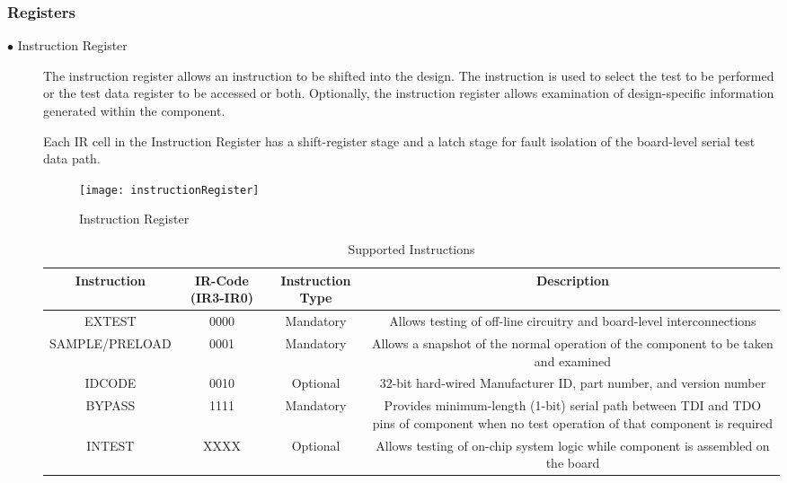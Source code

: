 \documentclass[a4paper,11pt]{article}
\begin{document}
\subsubsection{Registers}
\begin{description}
\item [$\bullet$ Instruction Register]
The instruction register allows an instruction to be shifted into the design. The instruction is used to select the test to be performed or the test data register to be accessed or both. Optionally, the instruction register allows examination of design-specific information generated within the component.

Each IR cell in the Instruction Register has a shift-register stage and a latch stage for fault isolation of the board-level serial test data path.

\begin{figure}[ht]
\centering
\texttt{[image: instructionRegister]}
\caption{Instruction Register}
\end{figure}

\begin{center}
\begin{table}[!h]
\caption{Supported Instructions}
\label{table:IR}
\begin{tabular}{|c|c|c|c|}
 \hline
 \textbf{Instruction} & \multicolumn{1}{m{2cm}|}{\textbf{IR-Code (IR3-IR0)}} & \multicolumn{1}{m{2cm}|}{\textbf{Instruction Type}} & \textbf{Description} \\ \hline
 
 EXTEST & 0000 & Mandatory & \multicolumn{1}{m{7cm}|}{Allows testing of off-line circuitry and board-level interconnections}\\\hline
 
 SAMPLE/PRELOAD & 0001 & Mandatory & \multicolumn{1}{m{7cm}|}{Allows a snapshot of the normal operation of the component to be taken and examined}\\\hline

 IDCODE & 0010 & Optional & \multicolumn{1}{m{7cm}|}{32-bit hard-wired Manufacturer ID, part number, and version number}\\\hline

BYPASS & 1111 & Mandatory & \multicolumn{1}{m{7cm}|}{Provides minimum-length (1-bit) serial path between TDI and TDO pins of component when no test operation of that component is required}\\\hline

 INTEST & XXXX & Optional & \multicolumn{1}{m{7cm}|}{Allows testing of on-chip system logic while component is assembled on the board}\\\hline 


\end{tabular}
\end{table}
\end{center}
\end{description}
\end{document}
